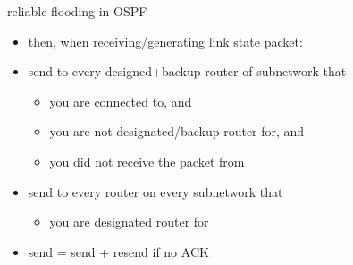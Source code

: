 \begin{frame}{reliable flooding in OSPF}
    \begin{itemize}
    \item then, when receiving/generating link state packet:
    \item send to every designed+backup router of subnetwork that
        \begin{itemize}
        \item you are connected to, and
        \item you are not designated/backup router for, and
        \item you did not receive the packet from
        \end{itemize}
    \item send to every router on every subnetwork that
        \begin{itemize}
        \item you are designated router for
        \end{itemize}
    \item send = send + resend if no ACK
    \end{itemize}
\end{frame}

